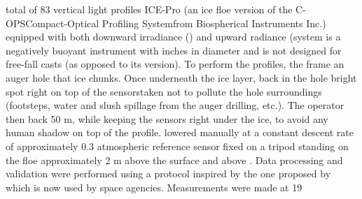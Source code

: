 \DIFdelbegin {}\DIFdelend \DIFaddbegin {}\DIFaddend total of 83 vertical light profiles \DIFdelbegin {}\DIFdelend \DIFaddbegin {}\DIFaddend ICE-Pro (an ice floe version of the C-OPS\DIFdelbegin \DIFdel{- }\DIFdelend \DIFaddbegin {}\DIFaddend Compact-Optical Profiling System\DIFdelbegin \DIFdel{- }\DIFdelend \DIFaddbegin \DIFadd{, }\DIFaddend from Biospherical Instruments Inc.) equipped with both downward \DIFaddbegin {}\DIFaddend irradiance \edz{} (\DIFdelbegin {}\DIFdelend \DIFaddbegin \wmsquare{}\DIFaddend ) and upward radiance \luz{} (\DIFdelbegin {}\DIFdelend \DIFaddbegin \wmsquaresr{}\DIFaddend system is a negatively buoyant instrument with \DIFaddbegin {} inches in diameter \DIFdelbegin {}\DIFdelend and is not designed for free-fall casts (as opposed to its \DIFdelbegin {}\DIFdelend \DIFaddbegin {}\DIFaddend version). To perform the \DIFdelbegin {}\DIFdelend profiles, the frame \DIFdelbegin {}\DIFdelend \DIFaddbegin {}\DIFaddend an auger hole that \DIFdelbegin {}\DIFdelend \DIFaddbegin {}\DIFaddend ice chunks. Once \DIFaddbegin {}\DIFaddend underneath the ice layer, \DIFdelbegin {}\DIFdelend \DIFaddbegin {}\DIFaddend back in the hole \DIFdelbegin {}\DIFdelend \DIFaddbegin {}\DIFaddend bright spot right on top of the sensors\DIFdelbegin {}\DIFdelend \DIFaddbegin {}\DIFaddend taken not to pollute the hole surroundings (footsteps, water and slush spillage from the auger drilling, etc.). The operator then \DIFdelbegin {}\DIFdelend \DIFaddbegin {}\DIFaddend back 50 m, while keeping the sensors right under the ice, to avoid any human shadow on top of the profile. \DIFdelbegin {}\DIFdelend \DIFaddbegin {}\DIFaddend lowered manually at a constant descent rate of approximately 0.3 \DIFdelbegin {}\DIFdelend \DIFaddbegin {}\DIFaddend atmospheric reference sensor \DIFdelbegin {}\DIFdelend \DIFaddbegin {}\DIFaddend fixed on a \DIFaddbegin {}\DIFaddend tripod standing on the floe \DIFdelbegin {}\DIFdelend approximately 2 m above the surface and above \DIFdelbegin {}\DIFdelend \DIFaddbegin {}\DIFaddend . Data processing and validation were performed using a protocol inspired by the one proposed by \citet{Smith1984} which is now used by \DIFdelbegin {}\DIFdelend \DIFaddbegin {}\DIFaddend space agencies. Measurements were made at 19 